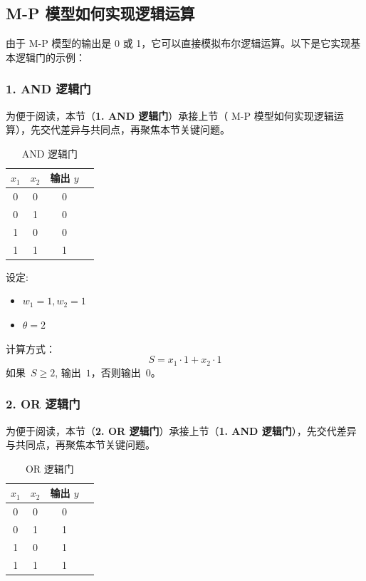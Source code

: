 \subsection{ M-P 模型如何实现逻辑运算}



由于 M-P 模型的输出是 0 或 1，它可以直接模拟布尔逻辑运算。以下是它实现基本逻辑门的示例：
\subsubsection*{\bf 1.  AND 逻辑门}


为便于阅读，本节（{\bf 1.  AND 逻辑门}）承接上节（ M-P 模型如何实现逻辑运算），先交代差异与共同点，再聚焦本节关键问题。

\begin{table}[htbp]
\centering
\caption{AND 逻辑门}
\begin{tabular}{|c|c|c|c|}
\hline
{\bf $x_1$} & $x_2$ & 输出 $y$ \\
\hline
0  & 0  & 0    \\
\hline
0  & 1  & 0    \\
\hline
1  & 0  & 0    \\
\hline
1  & 1  & 1    \\
\hline
\end{tabular}
\label{AND 逻辑门}
\end{table}
设定:
\begin{itemize}
\item $w_1 =1, w_2 =1$
\item $\theta =2$
\end{itemize}
计算方式：
$$ S= x_1 \cdot 1  + x_2 \cdot 1$$
如果~$ S\ge 2$, 输出~$1$，否则输出~$0$。
\subsubsection*{\bf 2.  OR 逻辑门}


为便于阅读，本节（{\bf 2.  OR 逻辑门}）承接上节（{\bf 1.  AND 逻辑门}），先交代差异与共同点，再聚焦本节关键问题。

\begin{table}[htbp]
\centering
\caption{OR 逻辑门}
\begin{tabular}{|c|c|c|c|}
\hline
{\bf $x_1$} & $x_2$ & 输出 $y$ \\
\hline
0  & 0  & 0    \\
\hline
0  & 1  & 1   \\
\hline
1  & 0  & 1    \\
\hline
1  & 1  & 1    \\
\hline
\end{tabular}
\label{OR 逻辑门}
\end{table}
